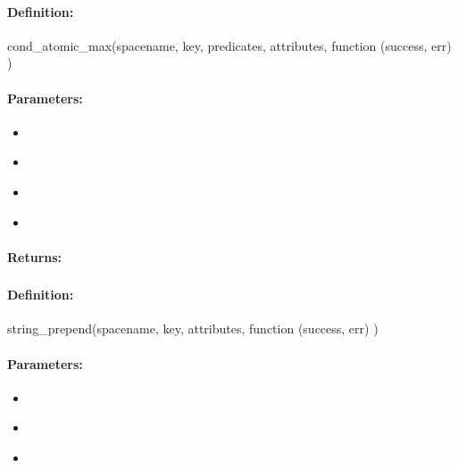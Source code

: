 \paragraph{Definition:}
\begin{javascriptcode}
cond_atomic_max(spacename, key, predicates, attributes, function (success, err) {})
\end{javascriptcode}
\paragraph{Parameters:}
\begin{itemize}[noitemsep]
\item {}\\

\item {}\\

\item {}\\

\item {}\\

\end{itemize}

\paragraph{Returns:}


\pagebreak
\subsubsection{}
\label{api:nodejs:string_prepend}


\paragraph{Definition:}
\begin{javascriptcode}
string_prepend(spacename, key, attributes, function (success, err) {})
\end{javascriptcode}
\paragraph{Parameters:}
\begin{itemize}[noitemsep]
\item {}\\

\item {}\\

\item {}\\

\end{itemize}

